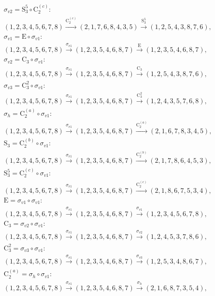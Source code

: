 \begin{align*}
& \sigma_{v2} = \mathrm{S}_{3}^{5} \circ \mathrm{C}_{2}^{(c)}:\; \\& (1,2,3,4,5,6,7,8) \xrightarrow{\mathrm{C}_{2}^{(c)}} (2,1,7,6,8,4,3,5) \xrightarrow{\mathrm{S}_{3}^{5}} (1,2,5,4,3,8,7,6), \\
& \sigma_{v1} = \mathrm{E} \circ \sigma_{v1}:\; \\& (1,2,3,4,5,6,7,8) \xrightarrow{\sigma_{v1}} (1,2,3,5,4,6,8,7) \xrightarrow{\mathrm{E}} (1,2,3,5,4,6,8,7), \\
& \sigma_{v2} = \mathrm{C}_{3} \circ \sigma_{v1}:\; \\& (1,2,3,4,5,6,7,8) \xrightarrow{\sigma_{v1}} (1,2,3,5,4,6,8,7) \xrightarrow{\mathrm{C}_{3}} (1,2,5,4,3,8,7,6), \\
& \sigma_{v3} = \mathrm{C}_{3}^{2} \circ \sigma_{v1}:\; \\& (1,2,3,4,5,6,7,8) \xrightarrow{\sigma_{v1}} (1,2,3,5,4,6,8,7) \xrightarrow{\mathrm{C}_{3}^{2}} (1,2,4,3,5,7,6,8), \\
& \sigma_{h} = \mathrm{C}_{2}^{(a)} \circ \sigma_{v1}:\; \\& (1,2,3,4,5,6,7,8) \xrightarrow{\sigma_{v1}} (1,2,3,5,4,6,8,7) \xrightarrow{\mathrm{C}_{2}^{(a)}} (2,1,6,7,8,3,4,5), \\
& \mathrm{S}_{3} = \mathrm{C}_{2}^{(b)} \circ \sigma_{v1}:\; \\& (1,2,3,4,5,6,7,8) \xrightarrow{\sigma_{v1}} (1,2,3,5,4,6,8,7) \xrightarrow{\mathrm{C}_{2}^{(b)}} (2,1,7,8,6,4,5,3), \\
& \mathrm{S}_{3}^{5} = \mathrm{C}_{2}^{(c)} \circ \sigma_{v1}:\; \\& (1,2,3,4,5,6,7,8) \xrightarrow{\sigma_{v1}} (1,2,3,5,4,6,8,7) \xrightarrow{\mathrm{C}_{2}^{(c)}} (2,1,8,6,7,5,3,4), \\
& \mathrm{E} = \sigma_{v1} \circ \sigma_{v1}:\; \\& (1,2,3,4,5,6,7,8) \xrightarrow{\sigma_{v1}} (1,2,3,5,4,6,8,7) \xrightarrow{\sigma_{v1}} (1,2,3,4,5,6,7,8), \\
& \mathrm{C}_{3} = \sigma_{v2} \circ \sigma_{v1}:\; \\& (1,2,3,4,5,6,7,8) \xrightarrow{\sigma_{v1}} (1,2,3,5,4,6,8,7) \xrightarrow{\sigma_{v2}} (1,2,4,5,3,7,8,6), \\
& \mathrm{C}_{3}^{2} = \sigma_{v3} \circ \sigma_{v1}:\; \\& (1,2,3,4,5,6,7,8) \xrightarrow{\sigma_{v1}} (1,2,3,5,4,6,8,7) \xrightarrow{\sigma_{v3}} (1,2,5,3,4,8,6,7), \\
& \mathrm{C}_{2}^{(a)} = \sigma_{h} \circ \sigma_{v1}:\; \\& (1,2,3,4,5,6,7,8) \xrightarrow{\sigma_{v1}} (1,2,3,5,4,6,8,7) \xrightarrow{\sigma_{h}} (2,1,6,8,7,3,5,4), \\

\end{align*}
